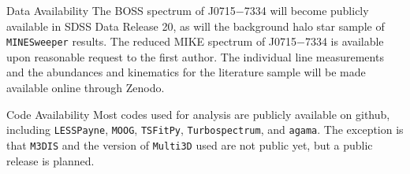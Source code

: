 \documentclass{natureprintstyle}
\newcommand{\code}[1]{\texttt{#1}\xspace}
\newcommand{\umpstar}{J0715$-$7334\xspace}
\begin{document}
\begin{addendum}
\item[Data Availability] 
The BOSS spectrum of \umpstar will become publicly available in SDSS Data Release 20, as will the background halo star sample of \code{MINESweeper} results.
The reduced MIKE spectrum of \umpstar is available upon reasonable request to the first author.
The individual line measurements and the abundances and kinematics for the literature sample will be made available online through Zenodo.

\item[Code Availability] 
Most codes used for analysis are publicly available on github, including
\code{LESSPayne}, 
\code{MOOG}, 
\code{TSFitPy},
\code{Turbospectrum}, and
\code{agama}.
The exception is that \code{M3DIS} and the version of \code{Multi3D} used are not public yet, but a public release is planned.



\end{addendum}


\end{document}
